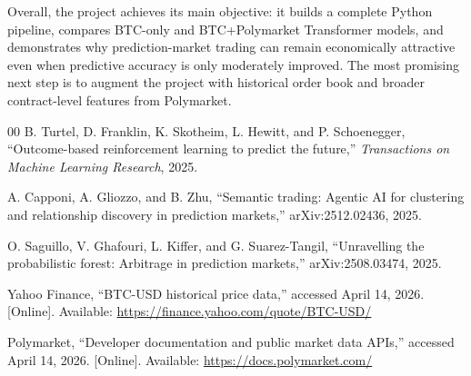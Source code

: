 \documentclass[conference]{IEEEtran}
\begin{document}
Overall, the project achieves its main objective: it builds a complete Python pipeline, compares BTC-only and BTC+Polymarket Transformer models, and demonstrates why prediction-market trading can remain economically attractive even when predictive accuracy is only moderately improved. The most promising next step is to augment the project with historical order book and broader contract-level features from Polymarket.

\begin{thebibliography}{00}
B. Turtel, D. Franklin, K. Skotheim, L. Hewitt, and P. Schoenegger, ``Outcome-based reinforcement learning to predict the future,'' \emph{Transactions on Machine Learning Research}, 2025.

A. Capponi, A. Gliozzo, and B. Zhu, ``Semantic trading: Agentic AI for clustering and relationship discovery in prediction markets,'' arXiv:2512.02436, 2025.

O. Saguillo, V. Ghafouri, L. Kiffer, and G. Suarez-Tangil, ``Unravelling the probabilistic forest: Arbitrage in prediction markets,'' arXiv:2508.03474, 2025.

Yahoo Finance, ``BTC-USD historical price data,'' accessed April 14, 2026. [Online]. Available: \url{https://finance.yahoo.com/quote/BTC-USD/}

Polymarket, ``Developer documentation and public market data APIs,'' accessed April 14, 2026. [Online]. Available: \url{https://docs.polymarket.com/}
\end{thebibliography}
\end{document}
